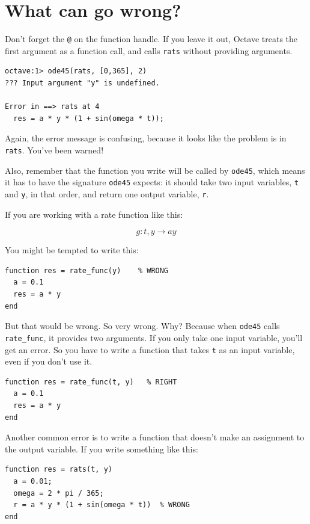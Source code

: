 \section{What can go wrong?}

Don't forget the {\tt @} on the function handle.
If you leave it out, Octave treats the first argument as a function
call, and calls {\tt rats} without providing arguments.

\begin{verbatim}
octave:1> ode45(rats, [0,365], 2)
??? Input argument "y" is undefined.

Error in ==> rats at 4
  res = a * y * (1 + sin(omega * t));
\end{verbatim}

Again, the error message is confusing, because it looks like the problem
is in {\tt rats}. You've been warned!

Also, remember that the function you write will be called by
{\tt ode45}, which means it has to have the signature {\tt ode45}
expects: it should take two input variables, {\tt t} and {\tt y},
in that order, and return one output variable, {\tt r}.

If you are working with a rate function like this:

\[ g : t, y \to a y \]

You might be tempted to write this:

\begin{verbatim}
function res = rate_func(y)    % WRONG
  a = 0.1
  res = a * y
end
\end{verbatim}

But that would be wrong. So very wrong. Why? Because
when {\tt ode45} calls {\tt rate\_func}, it provides two arguments.
If you only take one input variable, you'll get an error. So
you have to write a function that takes {\tt t} as an input
variable, even if you don't use it.

\begin{verbatim}
function res = rate_func(t, y)   % RIGHT
  a = 0.1
  res = a * y
end
\end{verbatim}

Another common error is to write a function that doesn't make
an assignment to the output variable. If you write something
like this:

\begin{verbatim}
function res = rats(t, y)
  a = 0.01;
  omega = 2 * pi / 365;
  r = a * y * (1 + sin(omega * t))  % WRONG
end
\end{verbatim}

